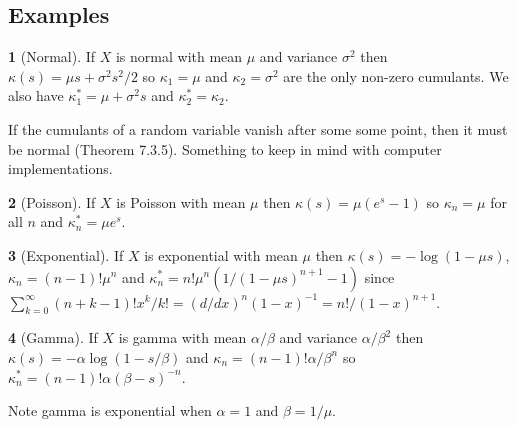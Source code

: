 \documentclass[11pt]{article}
\theoremstyle{definition}
\newtheorem*{example}{}
\begin{document}
\subsection{Examples}
\begin{example}[Normal]
If \(X\) is normal with mean \(\mu\) and variance \(\sigma^2\) then
\(\kappa(s) = \mu s + \sigma^2s^2/2\) so
\(\kappa_1 = \mu\) and \(\kappa_2 = \sigma^2\) are the only non-zero
cumulants. We also have \(\kappa_1^* = \mu + \sigma^2s\)
and \(\kappa_2^* = \kappa_2\).

If the cumulants of
a random variable vanish after some some point, then it must
be normal\cite{Luk1970} (Theorem 7.3.5).
Something to keep in mind with computer
implementations.
\end{example}
\begin{example}[Poisson]
If \(X\) is Poisson
with mean \(\mu\) then \(\kappa(s) = \mu(e^s - 1)\) so
\(\kappa_n = \mu\) for all \(n\) and
\(\kappa_n^* = \mu e^s\).
\end{example}
\begin{example}[Exponential]
If \(X\) is exponential with mean \(\mu\) then
\(\kappa(s) = -\log(1 - \mu s)\),
\(\kappa_n = (n - 1)!\mu^n\) and
\(\kappa_n^* = n!\mu^n(1/(1 - \mu s)^{n+1} - 1)\)
since \(\sum_{k=0}^\infty (n + k - 1)!x^k/k!
= (d/dx)^n(1 - x)^{-1} = n!/(1 - x)^{n + 1}\).
\end{example}
\begin{example}[Gamma]
If \(X\) is gamma with mean \(\alpha/\beta\) and variance
\(\alpha/\beta^2\) then
\(\kappa(s) = -\alpha\log(1 - s/\beta)\) and
\(\kappa_n = (n - 1)!\alpha/\beta^n\) so
\(\kappa_n^* = (n - 1)!\alpha(\beta - s)^{-n}\).

Note gamma is exponential when
\(\alpha = 1\) and \(\beta = 1/\mu\).
\end{example}
\end{document}
